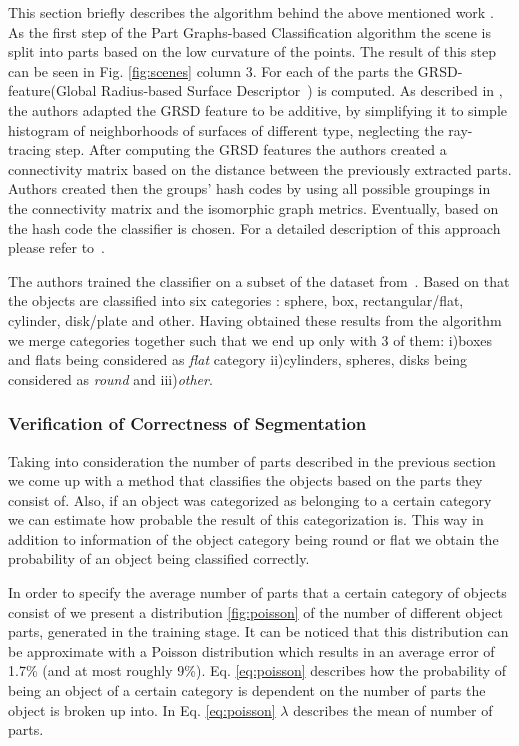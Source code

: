 This section briefly describes the algorithm behind the above mentioned work \cite{marton12SC}.
As the first step of the Part Graphs-based Classification algorithm the scene is split into parts based on the low curvature of the points. The result of this step can be seen in Fig. \ref{fig:scenes} column 3. For each of the parts the GRSD- feature(Global Radius-based Surface Descriptor~\cite{irosws11vosch}) is computed. 
 As described in \cite{irosws11vosch}, the authors adapted the GRSD feature to be additive, by simplifying it to simple histogram of neighborhoods of surfaces of different type, neglecting the ray-tracing step. After computing the GRSD features the authors created a connectivity matrix based on the distance between the previously extracted parts. Authors created then the groups' hash codes by using all possible groupings in the connectivity matrix and the isomorphic graph metrics. Eventually, based on the hash code the classifier is chosen. For a detailed description of this approach 
please refer to~\cite{marton12SC}.
 
The authors trained the classifier on a subset of the dataset from~\cite{lai11db}. Based on that the objects are classified into six categories :  sphere, box, rectangular/flat, cylinder, disk/plate and other.
Having obtained these results from the algorithm we merge categories together such that we end up only with 3 of them: i)boxes and flats being considered as \emph{flat} category ii)cylinders, spheres, disks being considered as \emph{round} and iii)\emph{other}. 


\subsubsection{Verification of Correctness of Segmentation}
\label{sec:probabilities}

Taking into consideration the number of parts described in the previous section we come up with a method that classifies the objects based on the parts they consist of. Also, if an object was categorized as belonging to a certain category we can estimate how probable the result of this categorization is. This way in addition to information of the object category being round or flat we obtain the probability of an object being classified correctly.

In order to specify the average number of parts that a certain category of objects consist of we present a distribution \ref{fig:poisson} of the number of different object parts, generated in the training stage. It can be noticed that this distribution can be approximate with a Poisson distribution which results in an average error of 1.7\% (and at most roughly 9\%). Eq. \ref{eq:poisson} describes how the probability of being an object of a certain category is dependent on the number of parts the object is broken up into. 
In Eq. \ref{eq:poisson} $\lambda$ describes the mean of number of parts.

